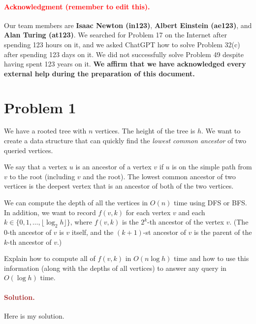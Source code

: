 \paragraph{\textcolor{red}{Acknowledgment (remember to edit this).}} Our team members are \textbf{Isaac Newton (in123)}, \textbf{Albert Einstein (ae123)}, and \textbf{Alan Turing (at123)}. We searched for Problem 17 on the Internet after spending 123 hours on it, and we asked ChatGPT how to solve Problem 32(c) after spending 123 days on it. We did not successfully solve Problem 49 despite having spent 123 years on it. \textbf{We affirm that we have acknowledged every external help during the preparation of this document.}


\section*{Problem 1}
We have a rooted tree with $n$ vertices. The height of the tree is $h$. We want to create a data structure that can quickly find the \emph{lowest common ancestor} of two queried vertices.

We say that a vertex $u$ is an ancestor of a vertex $v$ if $u$ is on the simple path from $v$ to the root (including $v$ and the root). The lowest common ancestor of two vertices is the deepest vertex that is an ancestor of both of the two vertices.

We can compute the depth of all the vertices in $O(n)$ time using DFS or BFS. In addition, we want to record $f(v, k)$ for each vertex $v$ and each $k \in \{0, 1, \ldots, \lfloor \log_2 h \rfloor\}$, where $f(v, k)$ is the $2^k$-th ancestor of the vertex $v$. (The $0$-th ancestor of $v$ is $v$ itself, and the $(k+1)$-st ancestor of $v$ is the parent of the $k$-th ancestor of $v$.)

Explain how to compute all of $f(v, k)$ in $O(n \log h)$ time and how to use this information (along with the depths of all vertices) to answer any query in $O(\log h)$ time.

\paragraph{\textcolor{brown}{Solution.}}
Here is my solution.


